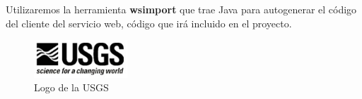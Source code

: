 Utilizaremos la herramienta {\bf wsimport} que trae Java para autogenerar el
código del cliente del servicio web, código que irá incluido en el proyecto.

\begin{figure}[H]
 \centering
 \includegraphics[width=35mm]{figuras/cap4/usgs.png}
 \caption{Logo de la USGS}
\end{figure}

